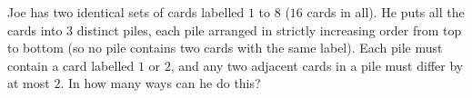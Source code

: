 Joe has two identical sets of cards labelled $1$ to $8$ ($16$ cards in all). He puts all the cards into $3$ distinct piles, each pile arranged in strictly increasing order from top to bottom (so no pile contains two cards with the same label). Each pile must contain a card labelled $1$ or $2$, and any two adjacent cards in a pile must differ by at most $2$. In how many ways can he do this?
